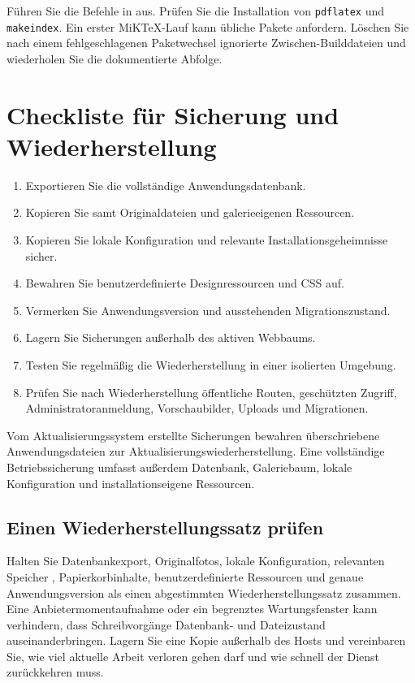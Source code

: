 \documentclass[11pt,a4paper]{article}
\newcommand{\filepath}[1]{\path{#1}}
\newcommand{\codeword}[1]{\nolinkurl{#1}}
\begin{document}
Führen Sie die Befehle in \filepath{docs/LATEX_BUILD.md} aus. Prüfen Sie die
Installation von \codeword{pdflatex} und \codeword{makeindex}. Ein erster
MiKTeX-Lauf kann übliche Pakete anfordern. Löschen Sie nach einem
fehlgeschlagenen Paketwechsel ignorierte Zwischen-Builddateien und wiederholen
Sie die dokumentierte Abfolge.

\section{Checkliste für Sicherung und Wiederherstellung}
\label{sec:backup}

\begin{enumerate}
  \item Exportieren Sie die vollständige Anwendungsdatenbank.
  \item Kopieren Sie \filepath{galleries/} samt Originaldateien und
  galerieeigenen Ressourcen.
  \item Kopieren Sie lokale Konfiguration und relevante Installationsgeheimnisse
  sicher.
  \item Bewahren Sie benutzerdefinierte Designressourcen und CSS auf.
  \item Vermerken Sie Anwendungsversion und ausstehenden Migrationszustand.
  \item Lagern Sie Sicherungen außerhalb des aktiven Webbaums.
  \item Testen Sie regelmäßig die Wiederherstellung in einer isolierten
  Umgebung.
  \item Prüfen Sie nach Wiederherstellung öffentliche Routen, geschützten
  Zugriff, Administratoranmeldung, Vorschaubilder, Uploads und Migrationen.
\end{enumerate}

Vom Aktualisierungssystem erstellte Sicherungen bewahren überschriebene
Anwendungsdateien zur Aktualisierungswiederherstellung. Eine vollständige
Betriebssicherung umfasst außerdem Datenbank, Galeriebaum, lokale Konfiguration
und installationseigene Ressourcen.

\subsection{Einen Wiederherstellungssatz prüfen}

Halten Sie Datenbankexport, Originalfotos, lokale Konfiguration, relevanten
Speicher \filepath{data/}, Papierkorbinhalte, benutzerdefinierte Ressourcen und
genaue Anwendungsversion als einen abgestimmten Wiederherstellungssatz zusammen.
Eine Anbietermomentaufnahme oder ein begrenztes Wartungsfenster kann verhindern,
dass Schreibvorgänge Datenbank- und Dateizustand auseinanderbringen. Lagern Sie
eine Kopie außerhalb des Hosts und vereinbaren Sie, wie viel aktuelle Arbeit
verloren gehen darf und wie schnell der Dienst zurückkehren muss.
\end{document}
